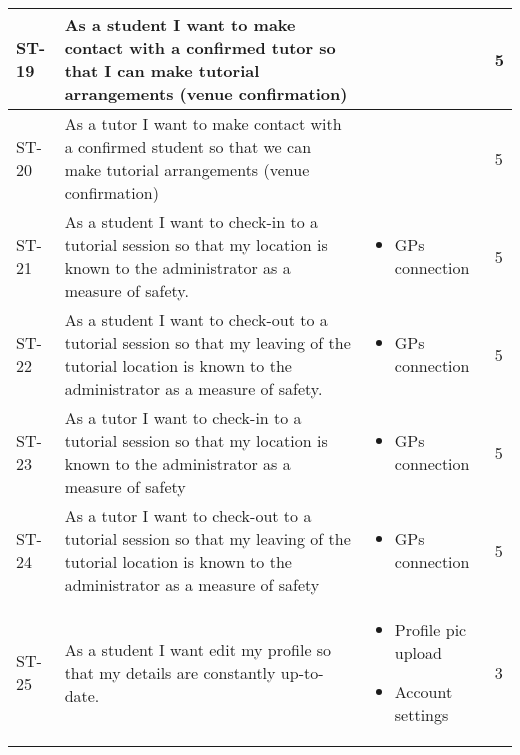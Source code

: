 \documentclass[12pt]{article}
\begin{document}
{\begin{longtable}{| p{1cm} | p{7cm}| p{5cm} | p{1cm} |}
			\\ \hline ST-19 & As a student I want to make contact with a confirmed tutor so that I can make tutorial arrangements (venue confirmation) & &5 
			
			\\ \hline ST-20 &As a tutor I want to make contact with a confirmed student so that we can make tutorial arrangements (venue confirmation)  & &5

			\\ \hline ST-21 & As a student I want to check-in to a tutorial session so that my location is known to the administrator as a measure of safety.  & \begin{itemize}
			\item GPs connection
\end{itemize}			 &5 
			
			\\ \hline ST-22 & As a student I want to check-out to a tutorial session so that my leaving of the tutorial location is known to the administrator as a measure of safety.  & \begin{itemize}
			\item GPs connection
\end{itemize}	 &5 
			
			\\ \hline ST-23 & As a tutor I want to check-in to a tutorial session so that my location is known to the administrator as a measure of safety  & \begin{itemize}
			\item GPs connection
\end{itemize}	 &5 
			
			\\ \hline ST-24 & As a tutor I want to check-out to a tutorial session so that my leaving of the tutorial location is known to the administrator as a measure of safety  & \begin{itemize}
			\item GPs connection
\end{itemize}	 &5 
			
			
			\\ \hline ST-25 & As a student I want edit my profile so that my details are constantly up-to-date.  & \begin{itemize}
			\item Profile pic upload
			\item Account settings
\end{itemize}			 &3
			

\end{longtable}}
\end{document}
